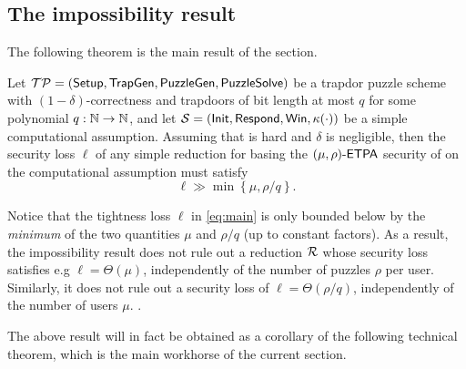 \subsection{The impossibility result}

The following theorem is the main result of the section.

\begin{theorem}\label{thm:main}
  Let \(\mathcal{TP} = (\mathsf{Setup},\allowbreak \mathsf{TrapGen},\allowbreak \mathsf{PuzzleGen},\allowbreak \mathsf{PuzzleSolve})\)
  be a trapdor puzzle scheme with \((1-\delta)\)-correctness
  and trapdoors of bit length at most \(q\) for some polynomial \(q : \mathbb{N} \to \mathbb{N}\),
  and let \(\mathcal{S} = (\mathsf{Init},\allowbreak \mathsf{Respond},\allowbreak \mathsf{Win},\allowbreak \kappa(\cdot))\)
  be a simple computational assumption.
  Assuming that \Simple is hard and \(\delta\) is negligible,
  then the security loss \(\ell\) of any simple reduction \redR
  for basing the \((\mu,\rho)\text{-}\mathsf{ETPA}\) security of \TP
  on the computational assumption \Simple must satisfy
  \begin{equation}\label{eq:main}
    \ell \gg \min \left\{ \mu, \rho / q \right\}.
  \end{equation}
\end{theorem}

Notice that the tightness loss \(\ell\) in \eqref{eq:main} is only bounded below by
the \emph{minimum} of the two quantities \(\mu\) and \(\rho/q\) (up to constant factors).
As a result, the impossibility result does not rule out a reduction \(\redR\)
whose security loss satisfies e.g \(\ell = \Theta(\mu)\), independently of the number of puzzles \(\rho\)
per user. Similarly, it does not rule out a security loss of
\(\ell = \Theta(\rho / q)\), independently of the number of users \(\mu\).
.

The above result will in fact be obtained as a corollary
of the following technical theorem,
which is the main workhorse of the current section.

